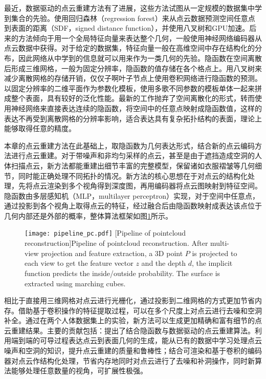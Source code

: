 最近，数据驱动的点云重建方法有了进展，这些方法试图从一定规模的数据集中学到集合的先验。\citet{ladicky17}使用回归森林（regression forest）来从点云数据预测空间任意点到表面的距离（SDF，signed distance function），并使用八叉树和GPU加速。后来的方法倾向于用一个全局特征向量来表达整个几何，一般使用神经网络编码器从点云数据中获得。对于给定的数据集，特征向量一般在高维空间中存在结构化的分布，因此网络从中学到的信息就可以用来作为一类几何的先验。隐函数在空间离散后形成三维网格，一般为固定分辨率，隐函数的值存储在各个格点上。\citet{ogn2017}用八叉树来减少离散网格的存储开销，仅仅子啊叶子节点上使用卷积网络进行隐函数的预测。\citet{groueix2018}以固定分辨率的二维平面作为参数化模板，使用多歌不同参数的模板单体一起来拼成整个表面，具有较好的泛化性能。最新的工作抛弃了空间离散化的形式，转而使用神经网络来直接表达连续的隐函数\citep{chen19, meshcheder2019cvpr, park2019cvpr}，将空间中的任意点映射成隐函数值，这样的表达不再受到离散网格的分辨率影响，适合表达具有复杂拓扑结构的表面，理论上能够取得任意的精度。

本章的点云重建方法在此基础上，取隐函数为几何表达形式，结合新的点云编码方法进行点云重建。对于带噪声和非均匀采样的点云，甚至是由于遮挡造成空洞的人体扫描点云，新方法都能重建出细节丰富的完整模型，保留诸如衣服褶皱等几何细节，同时能正确处理不同拓扑的情况。新方法的核心思想在于对点云的结构化处理，先将点云渲染到多个视角得到深度图，再用编码器将点云图映射到特征空间。隐函数由多层感知机（MLP，multilayer perceptron）实现，对于空间中任意点，通过投影到各个视角上取得点云的特征，经过融合后由隐函数映射成表达该点位于几何内部还是外部的概率，整体算法框架如图\ref{fig:pc_pipeline}所示。
\begin{figure}[!htbp]
    \centering
    \texttt{[image: pipeline\_pc.pdf]}
    [Pipeline of pointcloud reconstruction]{Pipeline of pointcloud reconstruction. After multi-view projection and feature extraction, a 3D point $P$ is projected to each view to get the feature vector $z$ and the depth $d$, the implicit function predicts the inside/outside probability. The surface is extracted using marching cubes.}
    \label{fig:pc_pipeline}
\end{figure}
相比于直接用三维网格对点云进行光栅化，通过投影到二维网格的方式更加节省内存。借助基于卷积操作的特征提取过程，可以在多个尺度上对点云进行去噪和空洞补全。通过在两个人体数据集上的实验，新方法可以生成更加精确和富有细节的点云重建结果。主要的贡献包括：提出了结合隐函数与数据驱动的点云重建算法。利用端到端的可导过程表达点云到表面几何的生成，能从已有的数据中学习处理点云噪声和空洞的知识，提升点云重建的质量和鲁棒性；结合可渲染和基于卷积的编码器对点云作结构化处理，节省内存地同时对点云进行了去噪和补洞操作，同时新算法能够处理任意数量的视角，可扩展性极强。

